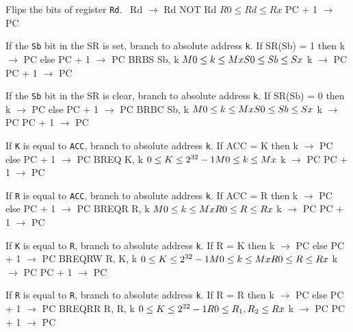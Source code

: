 \documentclass[titlepage]{scrartcl}
\begin{document}
{Flips the bits of register \texttt{Rd}.}
{\string~Rd $\rightarrow$ Rd}
{NOT Rd}
{$R0 \leq Rd \leq Rx$}
{PC + 1 $\rightarrow$ PC}
{}
{}

{If the \texttt{Sb} bit in the SR is set, branch to absolute address \texttt{k}.}
{If SR(Sb) = 1 then k $\rightarrow$ PC else PC + 1 $\rightarrow$ PC}
{BRBS Sb, k}
{$M0 \leq k \leq Mx \hfill \break S0 \leq Sb \leq Sx$}
{k $\rightarrow$ PC \hfill \break PC + 1 $\rightarrow$ PC}
{}
{\srtable{}{}{}{}}

{If the \texttt{Sb} bit in the SR is clear, branch to absolute address \texttt{k}.}
{If SR(Sb) = 0 then k $\rightarrow$ PC else PC + 1 $\rightarrow$ PC}
{BRBC Sb, k}
{$M0 \leq k \leq Mx \hfill \break S0 \leq Sb \leq Sx$}
{k $\rightarrow$ PC \hfill \break PC + 1 $\rightarrow$ PC}
{}
{\srtable{}{}{}{}}

{If \texttt{K} is equal to \texttt{ACC}, branch to absolute address \texttt{k}.}
{If ACC = K then k $\rightarrow$ PC else PC + 1 $\rightarrow$ PC}
{BREQ K, k}
{$0 \leq K \leq 2^{32} - 1 \hfill \break M0 \leq k \leq Mx$}
{k $\rightarrow$ PC \hfill \break PC + 1 $\rightarrow$ PC}
{}
{\srtable{}{}{}{}}

{If \texttt{R} is equal to \texttt{ACC}, branch to absolute address \texttt{k}.}
{If ACC = R then k $\rightarrow$ PC else PC + 1 $\rightarrow$ PC}
{BREQR R, k}
{$M0 \leq k \leq Mx \hfill \break R0 \leq R \leq Rx$}
{k $\rightarrow$ PC \hfill \break PC + 1 $\rightarrow$ PC}
{}
{\srtable{}{}{}{}}

{If \texttt{K} is equal to \texttt{R}, branch to absolute address \texttt{k}.}
{If R = K then k $\rightarrow$ PC else PC + 1 $\rightarrow$ PC}
{BREQRW R, K, k}
{$0 \leq K \leq 2^{32} - 1 \hfill \break M0 \leq k \leq Mx \hfill \break R0 \leq R \leq Rx$}
{k $\rightarrow$ PC \hfill \break PC + 1 $\rightarrow$ PC}
{}
{\srtable{}{}{}{}}

{If \texttt{R} is equal to \texttt{R}, branch to absolute address \texttt{k}.}
{If R = R then k $\rightarrow$ PC else PC + 1 $\rightarrow$ PC}
{BREQRR R, R, k}
{$0 \leq K \leq 2^{32} - 1 \hfill \break R0 \leq R_{1}, R_{2} \leq Rx$}
{k $\rightarrow$ PC \hfill \break PC + 1 $\rightarrow$ PC}
{}
{\srtable{}{}{}{}}
\end{document}
